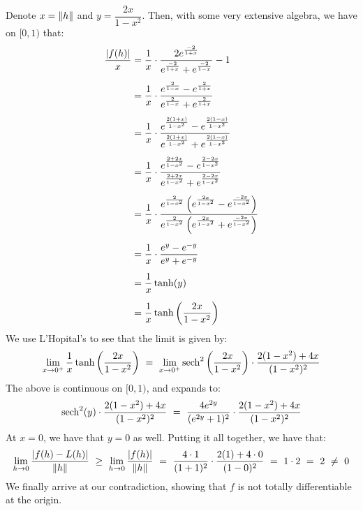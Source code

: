 \documentclass{article}
\begin{document}
\begin{soln}
    Denote $ x = \|h\| $ and $ y = \dfrac{2x}{1-x^{2}} $.
    Then, with some very extensive algebra, we have on $ [0, 1) $ that:
    \begin{align*}
        \frac{\abs{f(h)}}{x} & = \frac{1}{x} \cdot
        \frac{2e^{\frac{-2}{1+x}}}{e^{\frac{-2}{1+x}} + e^{\frac{-2}{1-x}}} - 1 \vsp
                             & = \frac{1}{x} \cdot
        \frac{e^{\frac{2}{1-x}} - e^{\frac{2}{1+x}}}{e^{\frac{2}{1-x}} + e^{\frac{2}{1+x}}} \vsp
                             & = \frac{1}{x} \cdot
        \frac{e^{\frac{2(1+x)}{1-x^{2}}} - e^{\frac{2(1-x)}{1-x^{2}}}}
        {e^{\frac{2(1+x)}{1-x^{2}}} + e^{\frac{2(1-x)}{1-x^{2}}}} \vsp
                             & = \frac{1}{x} \cdot
        \frac{e^{\frac{2+2x}{1-x^{2}}} - e^{\frac{2-2x}{1-x^{2}}}}
        {e^{\frac{2+2x}{1-x^{2}}} + e^{\frac{2-2x}{1-x^{2}}}} \vsp
                             & = \frac{1}{x} \cdot
        \frac{e^{\frac{2}{1-x^{2}}}\left( e^{\frac{2x}{1-x^{2}}} - e^{\frac{-2x}{1-x^{2}}} \right)}
        {e^{\frac{2}{1-x^{2}}}\left( e^{\frac{2x}{1-x^{2}}} + e^{\frac{-2x}{1-x^{2}}} \right)} \vsp
                             & = \frac{1}{x} \cdot
        \frac{e^{y} - e^{-y}}{e^{y} + e^{-y}} \vsp
                             & = \frac{1}{x} \tanh(y) \vsp
                             & = \frac{1}{x} \tanh \left( \frac{2x}{1-x^{2}} \right)
    \end{align*}
    We use L'Hopital's to see that the limit is given by:
    \begin{equation*}
        \lim_{x \rightarrow 0^{+}} \frac{1}{x}\tanh \left( \frac{2x}{1-x^{2}} \right)
        \ = \ \lim_{x \rightarrow 0^{+}} \sech^{2}\left( \frac{2x}{1-x^{2}} \right) \cdot
        \frac{2(1-x^{2}) + 4x}{(1-x^{2})^{2}}
    \end{equation*}
    The above is continuous on $ [0, 1) $, and expands to:
    \begin{equation*}
        \sech^{2}(y) \cdot \frac{2(1-x^{2}) + 4x}{(1-x^{2})^{2}}
        \ = \ \frac{4e^{2y}}{(e^{2y} +1)^{2}} \cdot \frac{2(1-x^{2}) + 4x}{(1-x^{2})^{2}}
    \end{equation*}
    At $ x = 0 $, we have that $ y = 0 $ as well. Putting it all together, we have that:
    \begin{equation*}
        \lim_{h\rightarrow0} \frac{\abs{f(h) - L(h)}}{\|h\|}
        \ \geq \ \lim_{h\rightarrow0} \frac{\abs{f(h)}}{\|h\|}
        \ = \ \frac{4 \cdot 1}{(1 + 1)^{2}} \cdot \frac{2(1) + 4 \cdot 0}{(1 - 0)^{2}}
        \ = \ 1 \cdot 2 \ = \ 2 \ \neq \ 0
    \end{equation*}
    We finally arrive at our contradiction, showing that $ f $ is not totally differentiable
    at the origin.
\end{soln} \vspace{-2mm}
\end{document}
